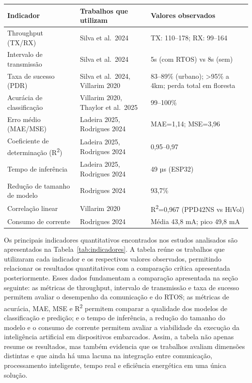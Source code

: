 \begin{center}
\small
{}
\label{tab:indicadores}
\begin{tabularx}{\textwidth}{|p{3.5cm}|p{4cm}|X|}
\hline
\textbf{Indicador} & \textbf{Trabalhos que utilizam} & \textbf{Valores observados} \\
\hline
Throughput (TX/RX) & Silva et al.\ 2024 & TX: 110–178; RX: 99–164 \\
\hline
Intervalo de transmissão & Silva et al.\ 2024 & 5s (com RTOS) vs 8s (sem) \\
\hline
Taxa de sucesso (PDR) & Silva et al.\ 2024, Villarim 2020 & 83–89\% (urbano); >95\% a 4km; perda total em floresta \\
\hline
Acurácia de classificação & Villarim 2020, Thaylor et al.\ 2025 & 99–100\% \\
\hline
Erro médio (MAE/MSE) & Ladeira 2025, Rodrigues 2024 & MAE=1,14; MSE=3,96 \\
\hline
Coeficiente de determinação (R\textsuperscript{2}) & Ladeira 2025, Rodrigues 2024 & 0,95–0,97 \\
\hline
Tempo de inferência & Ladeira 2025, Rodrigues 2024 & 49 µs (ESP32) \\
\hline
Redução de tamanho de modelo & Rodrigues 2024 & 93,7\% \\
\hline
Correlação linear & Villarim 2020 & R\textsuperscript{2}=0,967 (PPD42NS vs HiVol) \\
\hline
Consumo de corrente & Rodrigues 2024 & Média 43,8 mA; pico 49,8 mA \\
\hline
\end{tabularx}
\end{center}

Os principais indicadores quantitativos encontrados nos estudos analisados são
apresentados na Tabela~\ref{tab:indicadores}. A tabela reúne os trabalhos que
utilizaram cada indicador e os respectivos valores observados, permitindo relacionar
os resultados quantitativos com a comparação crítica apresentada posteriormente.
Esses dados fundamentam a comparação apresentada na seção seguinte: as métricas de throughput,
intervalo de transmissão e taxa de sucesso permitem avaliar o desempenho da
comunicação e do RTOS; as métricas de acurácia, MAE, MSE e R\textsuperscript{2}
permitem comparar a qualidade dos modelos de classificação e predição; e o tempo de
inferência, a redução do tamanho do modelo e o consumo de corrente permitem avaliar a
viabilidade da execução da inteligência artificial em dispositivos embarcados. Assim,
a tabela não apenas resume os resultados, mas também evidencia que os trabalhos
avaliam dimensões distintas e que ainda há uma lacuna na integração entre comunicação,
processamento inteligente, tempo real e eficiência energética em uma única solução.

